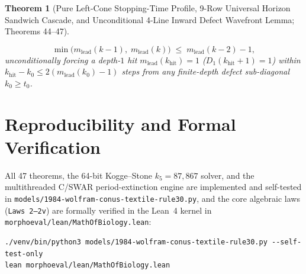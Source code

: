 \documentclass[11pt,a4paper]{article}
\newtheorem{theorem}{Theorem}[section]
\theoremstyle{definition}
\theoremstyle{remark}
\begin{document}
\begin{theorem}[Pure Left-Cone Stopping-Time Profile, 9-Row Universal Horizon Sandwich Cascade, and Unconditional 4-Line Inward Defect Wavefront Lemma; Theorems 44--47]
\begin{enumerate}
  \begin{equation}
    \min\bigl(m_{\mathrm{lead}}(k-1),\; m_{\mathrm{lead}}(k)\bigr) \;\le\; m_{\mathrm{lead}}(k-2) - 1,
  \end{equation}
  unconditionally forcing a depth-$1$ hit $m_{\mathrm{lead}}(k_{\mathrm{hit}}) = 1$ ($D_1(k_{\mathrm{hit}}+1) = 1$) within $k_{\mathrm{hit}} - k_0 \le 2(m_{\mathrm{lead}}(k_0) - 1)$ steps from any finite-depth defect sub-diagonal $k_0 \ge t_0$.
\end{enumerate}
\end{theorem}

\section{Reproducibility and Formal Verification}

\sloppy
All 47 theorems, the 64-bit Kogge--Stone $k_5 = 87{,}867$ solver, and the multithreaded C/SWAR period-extinction engine are implemented and self-tested in \texttt{models/1984-wolfram-conus-textile-rule30.py}, and the core algebraic laws (\texttt{Laws 2--2v}) are formally verified in the Lean~4 kernel in \texttt{morphoeval/lean/MathOfBiology.lean}:
\begin{verbatim}
./venv/bin/python3 models/1984-wolfram-conus-textile-rule30.py --self-test-only
lean morphoeval/lean/MathOfBiology.lean
\end{verbatim}
\end{document}
